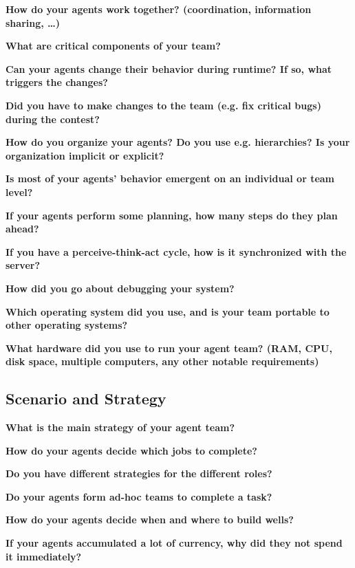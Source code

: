 \documentclass{llncs}
\begin{document}
\begin{description}
  \item \textbf{How do your agents work together? (coordination, information sharing, \ldots)}
  \item \textbf{What are critical components of your team?}
  \item \textbf{Can your agents change their behavior during runtime? If so, what triggers the changes?}
  \item \textbf{Did you have to make changes to the team (e.g. fix critical bugs) during the contest?}
  \item \textbf{How do you organize your agents? Do you use e.g. hierarchies? Is your organization implicit or explicit?}
  \item \textbf{Is most of your agents' behavior emergent on an individual or team level?}
  \item \textbf{If your agents perform some planning, how many steps do they plan ahead?}
  \item \textbf{If you have a perceive-think-act cycle, how is it synchronized with the server?}
  \item \textbf{How did you go about debugging your system?}
  \item \textbf{Which operating system did you use, and is your team portable to other operating systems?}
  \item \textbf{What hardware did you use to run your agent team? (RAM, CPU, disk space, multiple computers, any other notable requirements)}
\end{description}

\subsection{Scenario and Strategy}

\begin{description}
  \item \textbf{What is the main strategy of your agent team?}
  \item \textbf{How do your agents decide which jobs to complete?}
  \item \textbf{Do you have different strategies for the different roles?}
  \item \textbf{Do your agents form ad-hoc teams to complete a task?}
  \item \textbf{How do your agents decide when and where to build wells?}
  \item \textbf{If your agents accumulated a lot of currency, why did they not spend it immediately?}
\end{description}
\end{document}
